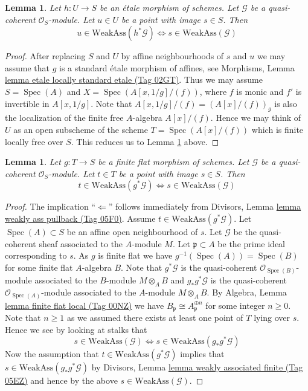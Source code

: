 \documentclass{amsart}
\theoremstyle{plain}
\newtheorem{lemma}[subsection]{Lemma}
\theoremstyle{definition}
\theoremstyle{remark}
\numberwithin{equation}{subsection}
\def\Spec{\mathop{\mathrm{Spec}}}
\begin{document}
\begin{lemma}
\label{lemma-etale-weak-assassin-up-down}
Let $h : U \to S$ be an \'etale morphism of schemes.
Let $\mathcal{G}$ be a quasi-coherent $\mathcal{O}_S$-module.
Let $u \in U$ be a point with image $s \in S$. Then
$$
u \in \text{WeakAss}(h^*\mathcal{G})
\Leftrightarrow
s \in \text{WeakAss}(\mathcal{G})
$$
\end{lemma}

\begin{proof}
After replacing $S$ and $U$ by affine neighbourhoods of $s$ and $u$
we may assume that $g$ is a standard \'etale morphism of affines, see
Morphisms, Lemma \href{https://stacks.math.columbia.edu/tag/02GT}{lemma etale locally standard etale (Tag 02GT)}.
Thus we may assume $S = \Spec(A)$ and
$X = \Spec(A[x, 1/g]/(f))$, where $f$ is monic and $f'$
is invertible in $A[x, 1/g]$.
Note that $A[x, 1/g]/(f) = (A[x]/(f))_g$ is also the localization
of the finite free $A$-algebra $A[x]/(f)$. Hence we may think of
$U$ as an open subscheme of the scheme $T = \Spec(A[x]/(f))$
which is finite locally free over $S$. This reduces us to
Lemma \ref{lemma-finite-flat-weak-assassin-up-down}
above.
\end{proof}


\begin{lemma}
\label{lemma-finite-flat-weak-assassin-up-down}
Let $g : T \to S$ be a finite flat morphism of schemes.
Let $\mathcal{G}$ be a quasi-coherent $\mathcal{O}_S$-module.
Let $t \in T$ be a point with image $s \in S$. Then
$$
t \in \text{WeakAss}(g^*\mathcal{G})
\Leftrightarrow
s \in \text{WeakAss}(\mathcal{G})
$$
\end{lemma}

\begin{proof}
The implication ``$\Leftarrow$'' follows immediately from
Divisors, Lemma \href{https://stacks.math.columbia.edu/tag/05F0}{lemma weakly ass pullback (Tag 05F0)}.
Assume $t \in \text{WeakAss}(g^*\mathcal{G})$.
Let $\Spec(A) \subset S$ be an affine open neighbourhood of $s$.
Let $\mathcal{G}$ be the quasi-coherent sheaf associated to the $A$-module $M$.
Let $\mathfrak p \subset A$ be the prime ideal corresponding to $s$.
As $g$ is finite flat we have $g^{-1}(\Spec(A)) = \Spec(B)$
for some finite flat $A$-algebra $B$. Note that
$g^*\mathcal{G}$ is the quasi-coherent $\mathcal{O}_{\Spec(B)}$-module
associated to the $B$-module $M \otimes_A B$ and $g_*g^*\mathcal{G}$ is the
quasi-coherent $\mathcal{O}_{\Spec(A)}$-module associated to the
$A$-module $M \otimes_A B$. By
Algebra, Lemma \href{https://stacks.math.columbia.edu/tag/00NZ}{lemma finite flat local (Tag 00NZ)}
we have $B_{\mathfrak p} \cong A_{\mathfrak p}^{\oplus n}$
for some integer $n \geq 0$. Note that $n \geq 1$ as we assumed there
exists at least one point of $T$ lying over $s$. Hence we see by
looking at stalks that
$$
s \in \text{WeakAss}(\mathcal{G})
\Leftrightarrow
s \in \text{WeakAss}(g_*g^*\mathcal{G})
$$
Now the assumption that $t \in \text{WeakAss}(g^*\mathcal{G})$
implies that $s \in \text{WeakAss}(g_*g^*\mathcal{G})$ by
Divisors, Lemma \href{https://stacks.math.columbia.edu/tag/05EZ}{lemma weakly associated finite (Tag 05EZ)}
and hence by the above $s \in  \text{WeakAss}(\mathcal{G})$.
\end{proof}
\end{document}
